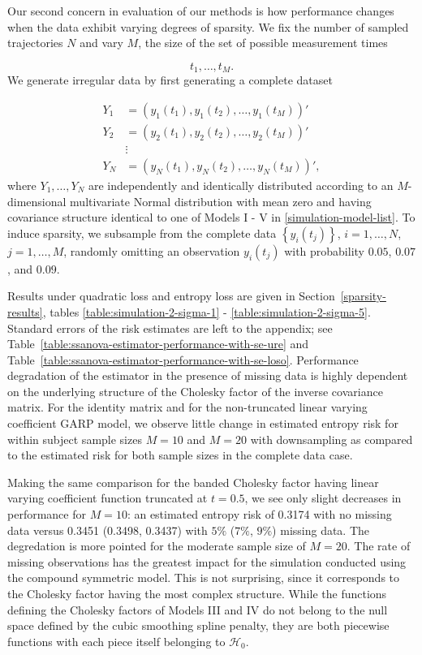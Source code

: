 
Our second concern in evaluation of our methods is how performance changes when the data exhibit varying degrees of sparsity. We fix the number of sampled trajectories $N$ and vary $M$, the size of the set  of possible measurement times

\[
t_1,\dots, t_M.
\]
\noindent
We generate irregular data by first generating a complete dataset 

\begin{align*}
Y_1 &= \left(y_1\left(t_1\right), y_1\left(t_2\right), \dots, y_1\left(t_M\right)\right)' \\
Y_2 &= \left(y_2\left(t_1\right), y_2\left(t_2\right), \dots, y_2\left(t_M\right)\right)' \\
&\vdots \\
Y_N &= \left(y_N\left(t_1\right), y_N\left(t_2\right), \dots, y_N\left(t_M\right)\right)',
\end{align*}
\noindent
where $Y_1,\dots, Y_N$ are independently and identically distributed according to an $M$-dimensional multivariate Normal distribution with mean zero and having covariance structure identical to one of Models I - V in \ref{simulation-model-list}. To induce sparsity, we subsample from the complete data $\left\{y_i\left(t_j\right) \right\}$, $i = 1,\dots, N$, $j = 1,\dots, M$, randomly omitting an observation $y_i\left(t_j\right)$ with probability $0.05$, $0.07$, and $0.09$.

\bigskip

Results under quadratic loss and entropy loss are given in Section~\ref{sparsity-results}, tables \ref{table:simulation-2-sigma-1} - \ref{table:simulation-2-sigma-5}.  Standard errors of the risk estimates are left to the appendix; see Table~\ref{table:ssanova-estimator-performance-with-se-ure} and Table~\ref{table:ssanova-estimator-performance-with-se-loso}.  Performance degradation of the estimator in the presence of missing data is highly dependent on the underlying structure of the Cholesky factor of the inverse covariance matrix. For the identity matrix and for the non-truncated linear varying coefficient GARP model, we observe little change in estimated entropy risk for within subject sample sizes $M = 10$ and $M = 20$ with downsampling as compared to the estimated risk for both sample sizes in the complete data case. 

\bigskip

Making the same comparison for the banded Cholesky factor having linear varying coefficient function truncated at $t = 0.5$, we see only slight decreases in performance for $M = 10$: an estimated entropy risk of 0.3174  with no missing data versus 0.3451 (0.3498, 0.3437) with $5\%$ ($7\%$, $9\%$) missing data. The degredation is more pointed for the moderate sample size of $M = 20$. The rate of missing observations has the greatest impact for the simulation conducted using the compound symmetric model. This is not surprising, since it corresponds to the Cholesky factor having the most complex structure. While the functions defining the Cholesky factors of Models III and IV do not belong to the null space defined by the cubic smoothing spline penalty, they are both piecewise functions with each piece itself belonging to $\mathcal{H}_0$.

